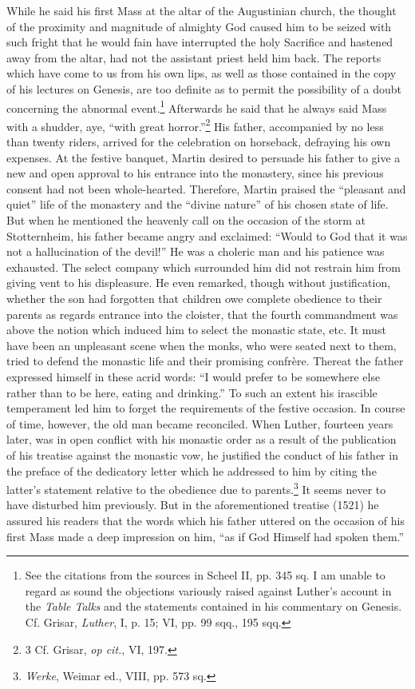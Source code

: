 While he said his first Mass at the altar of the Augustinian church,
the thought of the proximity and magnitude of almighty God caused
him to be seized with such fright that he would fain have interrupted
the holy Sacrifice and hastened away from the altar, had not
the assistant priest held him back. The reports which have come to
us from his own lips, as well as those contained in the copy of his
lectures on Genesis, are too definite as to permit the possibility of a
doubt concerning the abnormal event.\footnote{
See the citations from the sources in Scheel II, pp. 345 sq. I am unable to regard as
sound the objections variously raised against Luther’s account in the \textit{Table Talks} and the
statements contained in his commentary on Genesis. Cf. Grisar, \textit{Luther}, I, p. 15; VI, pp.
99 sqq., 195 sqq.
}
Afterwards he said that he
always said Mass with a shudder, aye, “with great horror.”\footnote{3 Cf. Grisar, \textit{op cit.}, VI, 197.}
His father, accompanied by no less than twenty riders, arrived for
the celebration on horseback, defraying his own expenses. At the
festive banquet, Martin desired to persuade his father to give a
new and open approval to his entrance into the monastery, since
his previous consent had not been whole-hearted. Therefore, Martin
praised the “pleasant and quiet” life of the monastery and the “divine
nature” of his chosen state of life. But when he mentioned the heavenly
call on the occasion of the storm at Stotternheim, his father
became angry and exclaimed: “Would to God that it was not a
hallucination of the devil!” He was a choleric man and his patience
was exhausted. The select company which surrounded him did not
restrain him from giving vent to his displeasure. He even remarked,
though without justification, whether the son had forgotten that
children owe complete obedience to their parents as regards entrance
into the cloister, that the fourth commandment was above the notion
which induced him to select the monastic state, etc. It must have
been an unpleasant scene when the monks, who were seated next to
them, tried to defend the monastic life and their promising confrère.
Thereat the father expressed himself in these acrid words: “I
would prefer to be somewhere else rather than to be here, eating
and drinking.” To such an extent his irascible temperament led him
to forget the requirements of the festive occasion. In course of time,
however, the old man became reconciled. When Luther, fourteen
years later, was in open conflict with his monastic order as a result
of the publication of his treatise against the monastic vow, he justified
the conduct of his father in the preface of the dedicatory letter
which he addressed to him by citing the latter’s statement relative
to the obedience due to parents.\footnote{\textit{Werke}, Weimar ed., VIII, pp. 573 sq.}
It seems never to have disturbed
him previously. But in the aforementioned treatise (1521) he
assured his readers that the words which his father uttered on the
occasion of his first Mass made a deep impression on him, “as if God
Himself had spoken them.”
